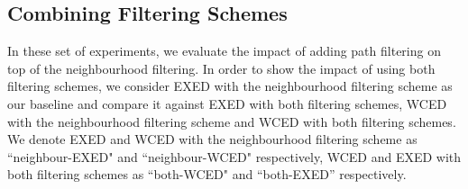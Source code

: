 \documentclass{sigmod}
\begin{document}

\subsection{Combining Filtering Schemes}
In these set of experiments, we evaluate the impact of adding path filtering on top of the neighbourhood filtering. In order to show the impact of using both filtering schemes, we consider EXED with the neighbourhood filtering scheme as our baseline and compare it against EXED with both filtering schemes, WCED with the neighbourhood filtering scheme and WCED with both filtering schemes. We denote EXED and WCED with the neighbourhood filtering scheme as ``neighbour-EXED" and ``neighbour-WCED" respectively, WCED and EXED with both filtering schemes as ``both-WCED" and ``both-EXED'' respectively. 
\end{document}
